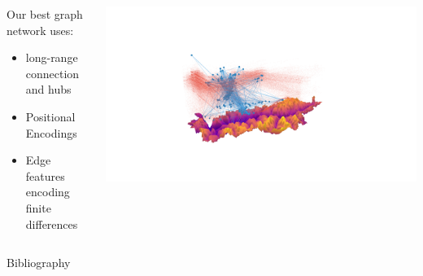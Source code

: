 \documentclass[aspectratio=169]{beamer}
\begin{document}
\begin{frame}
    \begin{columns}
        \begin{column}{0.4\textwidth}

            Our best graph network uses:
            \begin{itemize}
                \item long-range connection and hubs
                \item Positional Encodings
                \item Edge features encoding finite differences
            \end{itemize}

        \end{column}
        \begin{column}{0.6\textwidth}
            \centering
            \includegraphics[trim={13cm 6cm 15cm 8cm},clip,width=\textwidth]{imgs/south-gen.png}
        \end{column}
    \end{columns}
\end{frame}


\begin{colorframe}
    \begin{frame}[plain]{Bibliography}
        
        
    \end{frame}
\end{colorframe}
\end{document}
